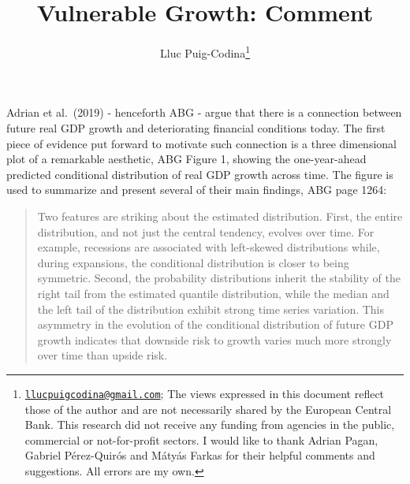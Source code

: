 \documentclass[
  11pt,
]{article}
\title{Vulnerable Growth: Comment}
\author{Lluc Puig-Codina\footnote{\href{mailto:llucpuigcodina@gmail.com}{\nolinkurl{llucpuigcodina@gmail.com}};
  The views expressed in this document reflect those of the author and
  are not necessarily shared by the European Central Bank. This research
  did not receive any funding from agencies in the public, commercial or
  not-for-profit sectors. I would like to thank Adrian Pagan, Gabriel
  Pérez-Quirós and Mátyás Farkas for their helpful comments and
  suggestions. All errors are my own.}}
\date{}
\begin{document}
\maketitle

\newpage


\vspace{0.5cm}

Adrian et al.~(2019) - henceforth ABG - argue that there is a connection
between future real GDP growth and deteriorating financial conditions
today. The first piece of evidence put forward to motivate such
connection is a three dimensional plot of a remarkable aesthetic, ABG
Figure 1, showing the one-year-ahead predicted conditional distribution
of real GDP growth across time. The figure is used to summarize and
present several of their main findings, ABG page 1264:

\begin{quote}
Two features are striking about the estimated distribution. First, the
entire distribution, and not just the central tendency, evolves over
time. For example, recessions are associated with left-skewed
distributions while, during expansions, the conditional distribution is
closer to being symmetric. Second, the probability distributions inherit
the stability of the right tail from the estimated quantile
distribution, while the median and the left tail of the distribution
exhibit strong time series variation. This asymmetry in the evolution of
the conditional distribution of future GDP growth indicates that
downside risk to growth varies much more strongly over time than upside
risk.
\end{quote}
\end{document}
